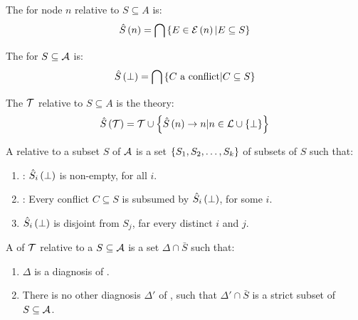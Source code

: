 \begin{defi}
The  for node $n$ relative to $S\subseteq A$ is:
\begin{equation}
\hat{S}\left(n\right)=\displaystyle\bigcap\left\{ E\in\mathcal{E}\left(n\right)|E\subseteq S\right\}
\end{equation}
\cite{conf/ijcai/RaimanKS93}
\end{defi}

\begin{defi}
The  for $S\subseteq\mathcal{A}$ is:
\begin{equation}
\hat{S}\left(\bot\right)=\displaystyle\bigcap\left\{ C\mbox{ a conflict}|C\subseteq S\right\}
\end{equation}
\cite{conf/ijcai/RaimanKS93}
\end{defi}

\begin{defi}
The  $\mathcal{T}$ relative to $S\subseteq A$ is the theory:
\begin{equation}
\hat{S}\left(\mathcal{T}\right)=\mathcal{T}\cup\left\{ \hat{S}\left(n\right)\rightarrow n|n\in\mathcal{L}\cup\left\{ \bot\right\}\right\}
\end{equation}
\cite{conf/ijcai/RaimanKS93}
\end{defi}

\begin{defi}
A  relative to a subset $S$ of $\mathcal{A}$ is a set $\left\{ S_1,S_2,\ldots,S_k\right\}$ of subsets of $S$ such that:
\begin{enumerate}
 \item {}: $\hat{S}_i\left(\bot\right)$ is non-empty, for all $i$.
 \item {}: Every conflict $C\subseteq S$ is subsumed by $\hat{S}_i\left(\bot\right)$, for some $i$.
 \item {} $\hat{S}_i\left(\bot\right)$ is disjoint from $S_j$, far every distinct $i$ and $j$.
\end{enumerate}
\cite{conf/ijcai/RaimanKS93}
\end{defi}

\begin{defi} A  of $\mathcal{T}$ relative to a $S\subseteq\mathcal{A}$ is a set $\Delta\cap\bar{S}$ such that:
\begin{enumerate}
 \item $\Delta$ is a diagnosis of .
 \item There is no other diagnosis $\Delta'$ of , such that $\Delta'\cap\bar{S}$ is a strict subset of $S\subseteq\mathcal{A}$.
\end{enumerate}
\cite{conf/ijcai/RaimanKS93}
\end{defi}

